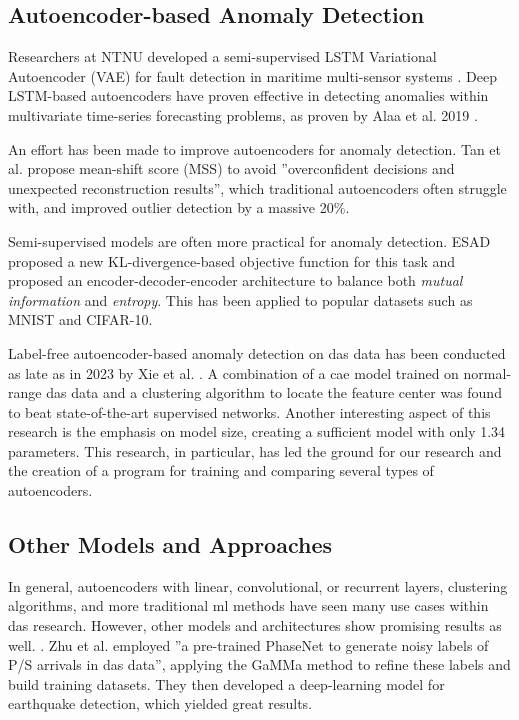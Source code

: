 \subsection{Autoencoder-based Anomaly Detection}

Researchers at NTNU developed a semi-supervised LSTM Variational Autoencoder (VAE) for fault detection in maritime multi-sensor systems \cite{9514856}. Deep LSTM-based autoencoders have proven effective in detecting anomalies within multivariate time-series forecasting problems, as proven by Alaa et al. 2019 \cite{alaaDeepLstm2019}. 

An effort has been made to improve autoencoders for anomaly detection. Tan et al. \cite{tan2023improving} propose mean-shift score (MSS) to avoid ''overconfident decisions and unexpected reconstruction results'', which traditional autoencoders often struggle with, and improved outlier detection by a massive 20\%. 

Semi-supervised models are often more practical for anomaly detection. ESAD \cite{huang2021esad} proposed a new KL-divergence-based objective function for this task and proposed an encoder-decoder-encoder architecture to balance both \textit{mutual information} and \textit{entropy}. This has been applied to popular datasets such as MNIST and CIFAR-10.

Label-free autoencoder-based anomaly detection on \acrshort{das} data has been conducted as late as in 2023 by Xie et al. \cite{xie2023label}. A combination of a \acrshort{cae} model trained on normal-range \acrshort{das} data and a clustering algorithm to locate the feature center was found to beat state-of-the-art supervised networks. Another interesting aspect of this research is the emphasis on model size, creating a sufficient model with only \qty{1.34}{\si{\kilo}} parameters. This research, in particular, has led the ground for our research and the creation of a program for training and comparing several types of autoencoders. 

\subsection{Other Models and Approaches}

In general, autoencoders with linear, convolutional, or recurrent layers, clustering algorithms, and more traditional \acrshort{ml} methods have seen many use cases within \acrshort{das} research. However,  other models and architectures show promising results as well. \cite{goodfellow2014generative, goodfellow2016nips}.
Zhu et al. \cite{zhu2023seismic} employed ''a pre-trained PhaseNet to generate noisy labels of P/S arrivals in \acrshort{das} data'', applying the GaMMa method to refine these labels and build training datasets. They then developed a deep-learning model for earthquake detection, which yielded great results.

